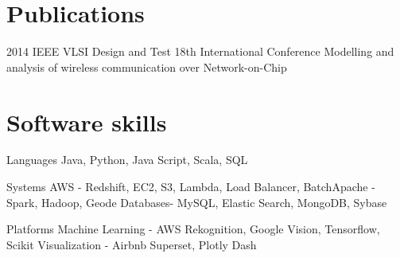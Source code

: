 \documentclass{tccv}
\begin{document}
\section{Publications}

\begin{yearlist}

\item{2014}
     {IEEE VLSI Design and Test 18th International Conference}
     {Modelling and analysis of wireless communication over Network-on-Chip}

\end{yearlist}

\section{Software skills}

\begin{factlist}

\item{Languages}
     {Java, Python, Java Script, Scala, SQL}

\item{Systems}
     {AWS - Redshift, EC2, S3, Lambda, Load Balancer, Batch\newline Apache - Spark, Hadoop, Geode \newline Databases- MySQL, Elastic Search, MongoDB, Sybase}

\item{Platforms}
	{Machine Learning - AWS Rekognition, Google Vision, Tensorflow, Scikit\newline
	Visualization - Airbnb Superset, Plotly Dash}
\end{factlist}
\end{document}
